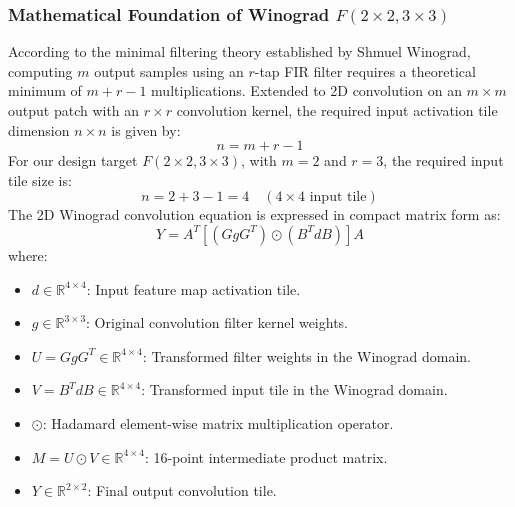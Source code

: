 \documentclass[12pt,a4paper]{article}
\begin{document}
\subsubsection{Mathematical Foundation of Winograd $F(2 \times 2, 3 \times 3)$}
According to the minimal filtering theory established by Shmuel Winograd, computing $m$ output samples using an $r$-tap FIR filter requires a theoretical minimum of $m + r - 1$ multiplications. Extended to 2D convolution on an $m \times m$ output patch with an $r \times r$ convolution kernel, the required input activation tile dimension $n \times n$ is given by:
\begin{equation}
    n = m + r - 1
\end{equation}
For our design target $F(2 \times 2, 3 \times 3)$, with $m = 2$ and $r = 3$, the required input tile size is:
\begin{equation}
    n = 2 + 3 - 1 = 4 \quad (4 \times 4 \text{ input tile})
\end{equation}
The 2D Winograd convolution equation is expressed in compact matrix form as:
\begin{equation}
    Y = A^T \left[ \left( G g G^T \right) \odot \left( B^T d B \right) \right] A
    \label{eq:winograd_2d}
\end{equation}
where:
\begin{itemize}
    \item $d \in \mathbb{R}^{4 \times 4}$: Input feature map activation tile.
    \item $g \in \mathbb{R}^{3 \times 3}$: Original convolution filter kernel weights.
    \item $U = G g G^T \in \mathbb{R}^{4 \times 4}$: Transformed filter weights in the Winograd domain.
    \item $V = B^T d B \in \mathbb{R}^{4 \times 4}$: Transformed input tile in the Winograd domain.
    \item $\odot$: Hadamard element-wise matrix multiplication operator.
    \item $M = U \odot V \in \mathbb{R}^{4 \times 4}$: 16-point intermediate product matrix.
    \item $Y \in \mathbb{R}^{2 \times 2}$: Final output convolution tile.
\end{itemize}
\end{document}
